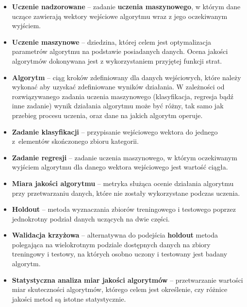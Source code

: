 \documentclass[12pt]{article}
\begin{document}
\begin{itemize}
	\item 
	\textbf{Uczenie nadzorowane} -- zadanie \textbf{uczenia maszynowego}, w którym dane uczące zawierają wektory wejściowe algorytmu wraz z jego oczekiwanym wyjściem\cite{Bishop2006}. 
	
	\item 
	\textbf{Uczenie maszynowe} -- dziedzina, której celem jest optymalizacja parametrów algorytmu na podstawie posiadanych danych. Ocena jakości algorytmów dokonywana jest z wykorzystaniem przyjętej funkcji strat\cite{Alpaydin2014}.
	
	\item
	\textbf{Algorytm} -- ciąg kroków zdefiniowany dla danych wejściowych, które należy wykonać aby uzyskać zdefiniowane wyników działania. W zależności od rozwiązywanego zadania uczenia maszynowego (klasyfikacja, regresja bądź inne zadanie) wynik działania algorytmu może być różny, tak samo jak przebieg procesu uczenia, oraz dane na jakich algorytm operuje.
	
	\item 
	\textbf{Zadanie klasyfikacji} -- przypisanie wejściowego wektora do jednego z~elementów skończonego zbioru kategorii\cite{Bishop2006}. 
	
	\item 
	\textbf{Zadanie regresji} -- zadanie uczenia maszynowego, w którym oczekiwanym wyjściem algorytmu dla danego wektora wejściowego jest wartość ciągła\cite{Bishop2006}.
	
	\item 
	\textbf{Miara jakości algorytmu} -- metryka służąca ocenie działania algorytmu przy przetwarzaniu danych, które nie zostały wykorzystane podczas uczenia.
	
	\item 
	\textbf{Holdout} -- metoda wyznaczania zbiorów treningowego i testowego poprzez jednokrotny podział danych uczących na dwie części.
	
	\item 
	\textbf{Walidacja krzyżowa} -- alternatywna do podejścia \textbf{holdout} metoda polegająca na wielokrotnym podziale dostępnych danych na zbiory treningowy i testowy, na których osobno uczony i testowany jest badany algorytm\cite{Alpaydin2014}.

	\item 
	\textbf{Statystyczna analiza miar jakości algorytmów} -- przetwarzanie wartości miar skuteczności algorytmów, którego celem jest określenie, czy różnice jakości metod są istotne statystycznie\cite{Dietterich1998}.
	
\end{itemize}
\end{document}
